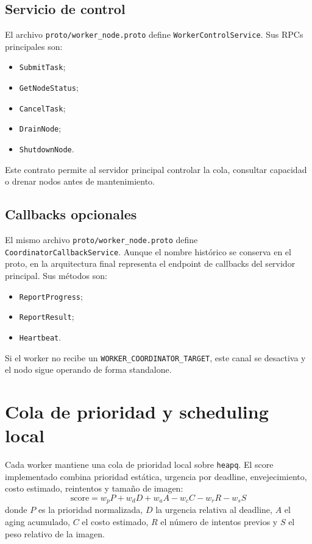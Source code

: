 \documentclass[conference]{IEEEtran}
\begin{document}
\subsection{Servicio de control}
El archivo \texttt{proto/worker\_node.proto} define \texttt{WorkerControlService}. Sus RPCs principales son:
\begin{itemize}[leftmargin=*]
\item \texttt{SubmitTask};
\item \texttt{GetNodeStatus};
\item \texttt{CancelTask};
\item \texttt{DrainNode};
\item \texttt{ShutdownNode}.
\end{itemize}

Este contrato permite al servidor principal controlar la cola, consultar capacidad o drenar nodos antes de mantenimiento.

\subsection{Callbacks opcionales}
El mismo archivo \texttt{proto/worker\_node.proto} define \texttt{CoordinatorCallbackService}. Aunque el nombre histórico se conserva en el proto, en la arquitectura final representa el endpoint de callbacks del servidor principal. Sus métodos son:
\begin{itemize}[leftmargin=*]
\item \texttt{ReportProgress};
\item \texttt{ReportResult};
\item \texttt{Heartbeat}.
\end{itemize}

Si el worker no recibe un \texttt{WORKER\_COORDINATOR\_TARGET}, este canal se desactiva y el nodo sigue operando de forma standalone.

\section{Cola de prioridad y scheduling local}
Cada worker mantiene una cola de prioridad local sobre \texttt{heapq}. El score implementado combina prioridad estática, urgencia por deadline, envejecimiento, costo estimado, reintentos y tamaño de imagen:
\begin{equation}
\label{eq:score}
\text{score} = w_p P + w_d D + w_a A - w_c C - w_r R - w_s S
\end{equation}
donde $P$ es la prioridad normalizada, $D$ la urgencia relativa al deadline, $A$ el aging acumulado, $C$ el costo estimado, $R$ el número de intentos previos y $S$ el peso relativo de la imagen.
\end{document}
